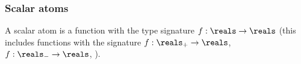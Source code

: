 \documentclass[11pt]{article}
\begin{document}
% 
% 
  
  
\subsubsection{Scalar atoms}
A scalar atom is a function with the type signature $f : \reals \to \reals$ (this includes functions with the signature $f : \reals_+ \to \reals$, $f : \reals_- \to \reals$, \etc).
\end{document}
